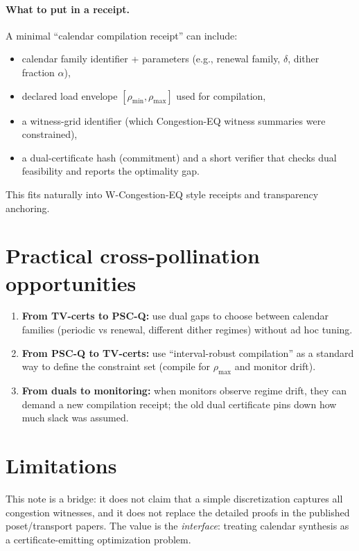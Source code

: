 \documentclass[11pt]{article}
\theoremstyle{definition}
\theoremstyle{remark}
\begin{document}
\paragraph{What to put in a receipt.}
A minimal ``calendar compilation receipt'' can include:
\begin{itemize}[leftmargin=1.2em]
\item calendar family identifier + parameters (e.g., renewal family, $\delta$, dither fraction $\alpha$),
\item declared load envelope $[\rho_{\min},\rho_{\max}]$ used for compilation,
\item a witness-grid identifier (which Congestion-EQ witness summaries were constrained),
\item a dual-certificate hash (commitment) and a short verifier that checks dual feasibility and reports the optimality gap.
\end{itemize}
This fits naturally into W-Congestion-EQ style receipts and transparency anchoring.

\section{Practical cross-pollination opportunities}
\begin{enumerate}[leftmargin=1.2em]
\item \textbf{From TV-certs to PSC-Q:} use dual gaps to choose between calendar families (periodic vs renewal, different dither regimes) without ad hoc tuning.
\item \textbf{From PSC-Q to TV-certs:} use ``interval-robust compilation'' as a standard way to define the constraint set (compile for $\rho_{\max}$ and monitor drift).
\item \textbf{From duals to monitoring:} when monitors observe regime drift, they can demand a new compilation receipt; the old dual certificate pins down how much slack was assumed.
\end{enumerate}

\section{Limitations}
This note is a bridge: it does not claim that a simple discretization captures all congestion witnesses,
and it does not replace the detailed proofs in the published poset/transport papers.
The value is the \emph{interface}: treating calendar synthesis as a certificate-emitting optimization problem.
\end{document}
